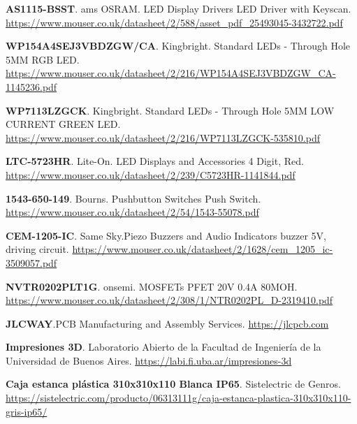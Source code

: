 \begin{thebibliography}{30}
\textbf{AS1115-BSST}. ams OSRAM. LED Display Drivers LED Driver with Keyscan.
\href{https://www.mouser.co.uk/datasheet/2/588/asset_pdf_25493045-3432722.pdf}{https://www.mouser.co.uk/datasheet/2/588/asset\_pdf\_25493045-3432722.pdf}

\textbf{WP154A4SEJ3VBDZGW/CA}. Kingbright. Standard LEDs - Through Hole 5MM RGB LED.
\href{https://www.mouser.co.uk/datasheet/2/216/WP154A4SEJ3VBDZGW_CA-1145236.pdf}{https://www.mouser.co.uk/datasheet/2/216/WP154A4SEJ3VBDZGW\_CA-1145236.pdf}


\textbf{WP7113LZGCK}. Kingbright. Standard LEDs - Through Hole 5MM LOW CURRENT GREEN LED.
\href{https://www.mouser.co.uk/datasheet/2/216/WP7113LZGCK-535810.pdf}{https://www.mouser.co.uk/datasheet/2/216/WP7113LZGCK-535810.pdf}

\textbf{LTC-5723HR}. Lite-On. LED Displays and Accessories 4 Digit, Red. 
\href{https://www.mouser.co.uk/datasheet/2/239/C5723HR-1141844.pdf}{https://www.mouser.co.uk/datasheet/2/239/C5723HR-1141844.pdf}

\textbf{1543-650-149}. Bourns. Pushbutton Switches Push Switch.
\href{https://www.mouser.co.uk/datasheet/2/54/1543-55078.pdf}{https://www.mouser.co.uk/datasheet/2/54/1543-55078.pdf}

\textbf{CEM-1205-IC}. Same Sky.Piezo Buzzers and Audio Indicators buzzer 5V, driving circuit.
\href{https://www.mouser.co.uk/datasheet/2/1628/cem_1205_ic-3509057.pdf}{https://www.mouser.co.uk/datasheet/2/1628/cem\_1205\_ic-3509057.pdf}


\textbf{NVTR0202PLT1G}. onsemi. MOSFETs PFET 20V 0.4A 80MOH.
\href{https://www.mouser.co.uk/datasheet/2/308/1/NTR0202PL_D-2319410.pdf}{https://www.mouser.co.uk/datasheet/2/308/1/NTR0202PL\_D-2319410.pdf}


\textbf{JLCWAY}.PCB Manufacturing and Assembly Services.
\href{https://jlcpcb.com}{https://jlcpcb.com}

\textbf{Impresiones 3D}. Laboratorio Abierto de la Facultad de Ingeniería de la Universidad de Buenos Aires.
\href{https://labi.fi.uba.ar/impresiones-3d}{https://labi.fi.uba.ar/impresiones-3d}

\textbf{Caja estanca plástica 310x310x110 Blanca IP65}. Sistelectric de Genros.
\href{https://sistelectric.com/producto/06313111g/caja-estanca-plastica-310x310x110-gris-ip65/}{https://sistelectric.com/producto/06313111g/caja-estanca-plastica-310x310x110-gris-ip65/}



\end{thebibliography}
